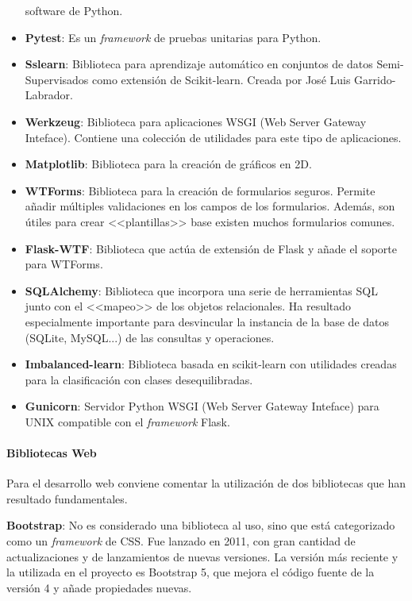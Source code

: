 \begin{itemize}
	software de Python.
	\item \textbf{Pytest}: Es un \emph{framework} de pruebas unitarias para
	Python.
	\item \textbf{Sslearn}: Biblioteca para aprendizaje automático en conjuntos de
	datos Semi-Supervisados como extensión de Scikit-learn. Creada por José Luis
	Garrido-Labrador.
	\item \textbf{Werkzeug}: Biblioteca para aplicaciones WSGI (Web Server Gateway
	Inteface). Contiene una colección de utilidades para este tipo de
	aplicaciones.
	\item \textbf{Matplotlib}: Biblioteca para la creación de gráficos en 2D.
	\item \textbf{WTForms}: Biblioteca para la creación de formularios seguros.
	Permite añadir múltiples validaciones en los campos de los formularios.
	Además, son útiles para crear <<plantillas>> base existen muchos formularios
	comunes.
	\item \textbf{Flask-WTF}: Biblioteca que actúa de extensión de Flask y añade
	el soporte para WTForms.
	\item \textbf{SQLAlchemy}: Biblioteca que incorpora una serie de herramientas
	SQL junto con el <<mapeo>> de los objetos relacionales. Ha resultado
	especialmente importante para desvincular la instancia de la base de datos
	(SQLite, MySQL...) de las consultas y operaciones.
	\item \textbf{Imbalanced-learn}: Biblioteca basada en scikit-learn con
	utilidades creadas para la clasificación con clases desequilibradas.
	\item \textbf{Gunicorn}: Servidor Python WSGI (Web Server Gateway Inteface)
	para UNIX compatible con el \emph{framework} Flask.
\end{itemize}

\paragraph{Bibliotecas Web} Para el desarrollo web conviene comentar la
utilización de dos bibliotecas que han resultado fundamentales.

\textbf{Bootstrap}: No es considerado una biblioteca al uso, sino que está
categorizado como un \emph{framework} de CSS. Fue lanzado en 2011, con gran
cantidad de actualizaciones y de lanzamientos de nuevas versiones. La versión
más reciente y la utilizada en el proyecto es Bootstrap 5, que mejora el código
fuente de la versión 4 y añade propiedades nuevas. 

